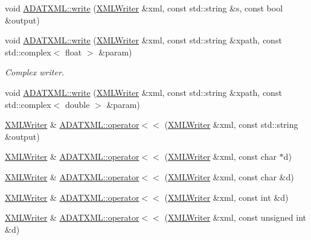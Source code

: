 \begin{DoxyCompactItemize}
\item 
void \mbox{\hyperlink{group__io_gaa6f01baa873f2c676d573b16ff3a1099}{A\+D\+A\+T\+X\+M\+L\+::write}} (\mbox{\hyperlink{classADATXML_1_1XMLWriter}{X\+M\+L\+Writer}} \&xml, const std\+::string \&s, const bool \&output)
\item 
void \mbox{\hyperlink{group__io_ga120f4c9a4f62f8190c2d87d73124fded}{A\+D\+A\+T\+X\+M\+L\+::write}} (\mbox{\hyperlink{classADATXML_1_1XMLWriter}{X\+M\+L\+Writer}} \&xml, const std\+::string \&xpath, const std\+::complex$<$ float $>$ \&param)
\begin{DoxyCompactList}\small\item\em Complex writer. \end{DoxyCompactList}\item 
void \mbox{\hyperlink{group__io_ga841e4774bcd8f9d6b7d0d8f0ae20d34f}{A\+D\+A\+T\+X\+M\+L\+::write}} (\mbox{\hyperlink{classADATXML_1_1XMLWriter}{X\+M\+L\+Writer}} \&xml, const std\+::string \&xpath, const std\+::complex$<$ double $>$ \&param)
\item 
\mbox{\hyperlink{classADATXML_1_1XMLWriter}{X\+M\+L\+Writer}} \& \mbox{\hyperlink{group__io_gaf8d83226be4c0dca61d0f9d2cad6f57b}{A\+D\+A\+T\+X\+M\+L\+::operator$<$$<$}} (\mbox{\hyperlink{classADATXML_1_1XMLWriter}{X\+M\+L\+Writer}} \&xml, const std\+::string \&output)
\item 
\mbox{\hyperlink{classADATXML_1_1XMLWriter}{X\+M\+L\+Writer}} \& \mbox{\hyperlink{group__io_ga1e77b0f38cdffd40d5f5d947a4527bb4}{A\+D\+A\+T\+X\+M\+L\+::operator$<$$<$}} (\mbox{\hyperlink{classADATXML_1_1XMLWriter}{X\+M\+L\+Writer}} \&xml, const char $\ast$d)
\item 
\mbox{\hyperlink{classADATXML_1_1XMLWriter}{X\+M\+L\+Writer}} \& \mbox{\hyperlink{group__io_gaaf7119c0afc1e8701f12daa5d349ae00}{A\+D\+A\+T\+X\+M\+L\+::operator$<$$<$}} (\mbox{\hyperlink{classADATXML_1_1XMLWriter}{X\+M\+L\+Writer}} \&xml, const char \&d)
\item 
\mbox{\hyperlink{classADATXML_1_1XMLWriter}{X\+M\+L\+Writer}} \& \mbox{\hyperlink{group__io_gab642b539df5696daa03675faadf87dfc}{A\+D\+A\+T\+X\+M\+L\+::operator$<$$<$}} (\mbox{\hyperlink{classADATXML_1_1XMLWriter}{X\+M\+L\+Writer}} \&xml, const int \&d)
\item 
\mbox{\hyperlink{classADATXML_1_1XMLWriter}{X\+M\+L\+Writer}} \& \mbox{\hyperlink{group__io_ga24986bf3413f6b83f58f5941f2c68db7}{A\+D\+A\+T\+X\+M\+L\+::operator$<$$<$}} (\mbox{\hyperlink{classADATXML_1_1XMLWriter}{X\+M\+L\+Writer}} \&xml, const unsigned int \&d)
\item 

\end{DoxyCompactItemize}
